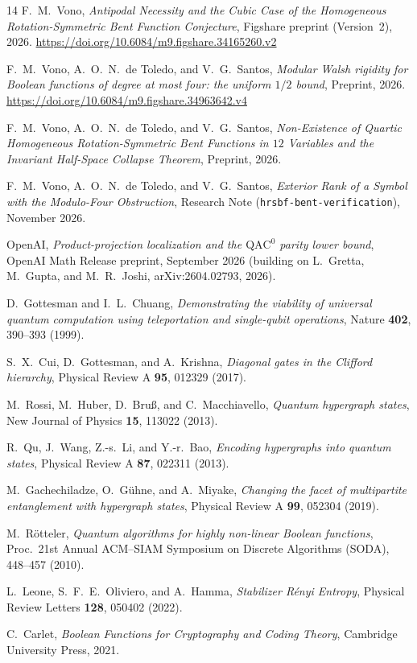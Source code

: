 \documentclass[11pt,a4paper]{article}
\begin{document}
\begin{thebibliography}{14}
F.~M.~Vono,
\emph{Antipodal Necessity and the Cubic Case of the Homogeneous Rotation-Symmetric Bent Function Conjecture},
Figshare preprint (Version~2), 2026. \url{https://doi.org/10.6084/m9.figshare.34165260.v2}

F.~M.~Vono, A.~O.~N.~de Toledo, and V.~G.~Santos,
\emph{Modular Walsh rigidity for Boolean functions of degree at most four: the uniform $1/2$ bound},
Preprint, 2026. \url{https://doi.org/10.6084/m9.figshare.34963642.v4}

F.~M.~Vono, A.~O.~N.~de Toledo, and V.~G.~Santos,
\emph{Non-Existence of Quartic Homogeneous Rotation-Symmetric Bent Functions in $12$ Variables and the Invariant Half-Space Collapse Theorem},
Preprint, 2026.

F.~M.~Vono, A.~O.~N.~de Toledo, and V.~G.~Santos,
\emph{Exterior Rank of a Symbol with the Modulo-Four Obstruction},
Research Note (\texttt{hrsbf-bent-verification}), November 2026.

OpenAI,
\emph{Product-projection localization and the $\mathrm{QAC}^0$ parity lower bound},
OpenAI Math Release preprint, September 2026 (building on L.~Gretta, M.~Gupta, and M.~R.~Joshi, arXiv:2604.02793, 2026).

D.~Gottesman and I.~L.~Chuang,
\emph{Demonstrating the viability of universal quantum computation using teleportation and single-qubit operations},
Nature \textbf{402}, 390--393 (1999).

S.~X.~Cui, D.~Gottesman, and A.~Krishna,
\emph{Diagonal gates in the Clifford hierarchy},
Physical Review A \textbf{95}, 012329 (2017).

M.~Rossi, M.~Huber, D.~Bru\ss, and C.~Macchiavello,
\emph{Quantum hypergraph states},
New Journal of Physics \textbf{15}, 113022 (2013).

R.~Qu, J.~Wang, Z.-s.~Li, and Y.-r.~Bao,
\emph{Encoding hypergraphs into quantum states},
Physical Review A \textbf{87}, 022311 (2013).

M.~Gachechiladze, O.~G\"uhne, and A.~Miyake,
\emph{Changing the facet of multipartite entanglement with hypergraph states},
Physical Review A \textbf{99}, 052304 (2019).

M.~R\"otteler,
\emph{Quantum algorithms for highly non-linear Boolean functions},
Proc.\ 21st Annual ACM--SIAM Symposium on Discrete Algorithms (SODA), 448--457 (2010).

L.~Leone, S.~F.~E.~Oliviero, and A.~Hamma,
\emph{Stabilizer R\'enyi Entropy},
Physical Review Letters \textbf{128}, 050402 (2022).

C.~Carlet,
\emph{Boolean Functions for Cryptography and Coding Theory},
Cambridge University Press, 2021.
\end{thebibliography}
\end{document}
